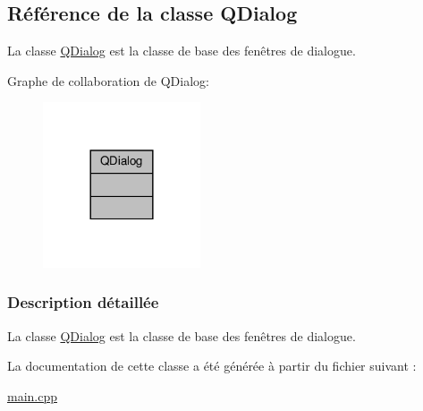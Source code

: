 \hypertarget{class_q_dialog}{}\subsection{Référence de la classe Q\+Dialog}
\label{class_q_dialog}


La classe \hyperlink{class_q_dialog}{Q\+Dialog} est la classe de base des fenêtres de dialogue.  




Graphe de collaboration de Q\+Dialog\+:\nopagebreak
\begin{figure}[H]
\begin{center}
\leavevmode
\includegraphics[width=132pt]{class_q_dialog__coll__graph}
\end{center}
\end{figure}


\subsubsection{Description détaillée}
La classe \hyperlink{class_q_dialog}{Q\+Dialog} est la classe de base des fenêtres de dialogue. 

La documentation de cette classe a été générée à partir du fichier suivant \+:\begin{DoxyCompactItemize}
\item 
\hyperlink{main_8cpp}{main.\+cpp}\end{DoxyCompactItemize}
